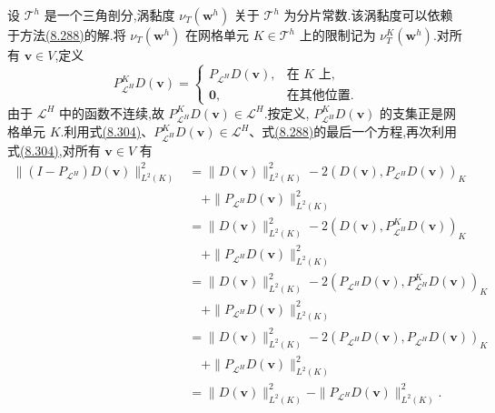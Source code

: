 \begin{note}[修正黏度的定义]
\label{note:vms-coarse-projection-modified-viscosity}
设 $\mathcal T^h$ 是一个三角剖分,涡黏度 $\nu_T(\bm w^h)$ 关于 $\mathcal T^h$ 为分片常数.该涡黏度可以依赖于方法\hyperref[eq:vms-coarse-projection-three-scale-method]{(8.288)}的解.将 $\nu_T(\bm w^h)$ 在网格单元 $K\in\mathcal T^h$ 上的限制记为 $\nu_T^K(\bm w^h)$.对所有 $\bm v\in V$,定义
\begin{equation}\label{eq:vms-coarse-projection-local-projection}
 P_{\mathcal L^H}^K D(\bm v)=
 \begin{cases}
  P_{\mathcal L^H}D(\bm v),&\text{在 }K\text{ 上},\\
  \bm 0,&\text{在其他位置}.
 \end{cases}
\end{equation}
由于 $\mathcal L^H$ 中的函数不连续,故
$P_{\mathcal L^H}^K D(\bm v)\in\mathcal L^H$.按定义,
$P_{\mathcal L^H}^K D(\bm v)$ 的支集正是网格单元 $K$.利用式\hyperref[eq:vms-coarse-projection-local-projection]{(8.304)}、$P_{\mathcal L^H}^K D(\bm v)\in\mathcal L^H$、式\hyperref[eq:vms-coarse-projection-three-scale-method]{(8.288)}的最后一个方程,再次利用式\hyperref[eq:vms-coarse-projection-local-projection]{(8.304)},对所有 $\bm v\in V$ 有
\begin{equation}\label{eq:vms-coarse-projection-pythagorean-identity}
\begin{aligned}
 \|(I-P_{\mathcal L^H})D(\bm v)\|_{L^2(K)}^2
 &=\|D(\bm v)\|_{L^2(K)}^2
   -2(D(\bm v),P_{\mathcal L^H}D(\bm v))_K\\
 &\quad+\|P_{\mathcal L^H}D(\bm v)\|_{L^2(K)}^2\\
 &=\|D(\bm v)\|_{L^2(K)}^2
   -2(D(\bm v),P_{\mathcal L^H}^KD(\bm v))_K\\
 &\quad+\|P_{\mathcal L^H}D(\bm v)\|_{L^2(K)}^2\\
 &=\|D(\bm v)\|_{L^2(K)}^2
   -2(P_{\mathcal L^H}D(\bm v),P_{\mathcal L^H}^KD(\bm v))_K\\
 &\quad+\|P_{\mathcal L^H}D(\bm v)\|_{L^2(K)}^2\\
 &=\|D(\bm v)\|_{L^2(K)}^2
   -2(P_{\mathcal L^H}D(\bm v),P_{\mathcal L^H}D(\bm v))_K\\
 &\quad+\|P_{\mathcal L^H}D(\bm v)\|_{L^2(K)}^2\\
 &=\|D(\bm v)\|_{L^2(K)}^2
   -\|P_{\mathcal L^H}D(\bm v)\|_{L^2(K)}^2.
\end{aligned}
\end{equation}


\end{note}
